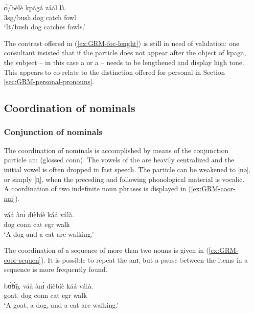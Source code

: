 \begin{exe}
\begin{exe}
\begin{exe}
\begin{exe}
\begin{exe}
\begin{exe}
\begin{exe}
\begin{exe}
\begin{exe}
\begin{exe}
\ex\label{ex:GRM-foc-w-lenght-3} 
\gll  ʊ̀/bèlè kpágá záál là.\\
 {\sc 3sg}/bush.dog catch fowl {\foc}\\
 \glt  `It/bush dog catches {\sc fowls}.'

\z
\z


The  contrast offered in (\ref{ex:GRM-foc-lenght}) is still in need of validation:  one 
consultant insisted that if the  particle does not appear after the object of {\sls kpaga}, the 
subject --  in this case a  or a  -- needs to be lengthened and display high tone. 
This appears to co-relate to the distinction offered for personal  in Section 
\ref{sec:GRM-personal-pronouns}.


\subsection{Coordination of nominals}
\label{sec:GRM-coord-nom}

\subsubsection{Conjunction of nominals}
\label{sec:GRM-conjunc-nom}


The coordination of nominals is accomplished by means of the conjunction particle {\sls anɪ} (glossed {\sc conn}).  The vowels of the  are heavily centralized and the initial vowel is often dropped in fast speech. The particle can be weakened to [nə], or simply [n̩], when the preceding and following phonological material is vocalic.  A coordination of two indefinite noun phrases is displayed in (\ref{ex:GRM-coor-ani}). 


 \ea\label{ex:GRM-coor-ani} 
 \gll váá ànɪ́ dìèbíè káá válà.\\
dog {\sc conn} cat {\sc  egr} walk\\
 \glt  `A dog and a cat are walking.'
\z

 The coordination of a sequence of more than two nouns is given in (\ref{ex:GRM-coor-sequen}). It is possible to repeat the  {\sls anɪ}, but a pause between the items in a sequence is more frequently found. 

 \ea\label{ex:GRM-coor-sequen} 
 \gll  bʊ̃́ʊ̃́ŋ, váà ànɪ́ dìèbíè káá válà.\\
 goat,  dog {\sc conn} cat {\sc  egr} walk\\
 \glt   `A goat, a dog, and a cat are walking.'
\z


\end{exe}
\end{exe}
\end{exe}
\end{exe}
\end{exe}
\end{exe}
\end{exe}
\end{exe}
\end{exe}
\end{exe}
